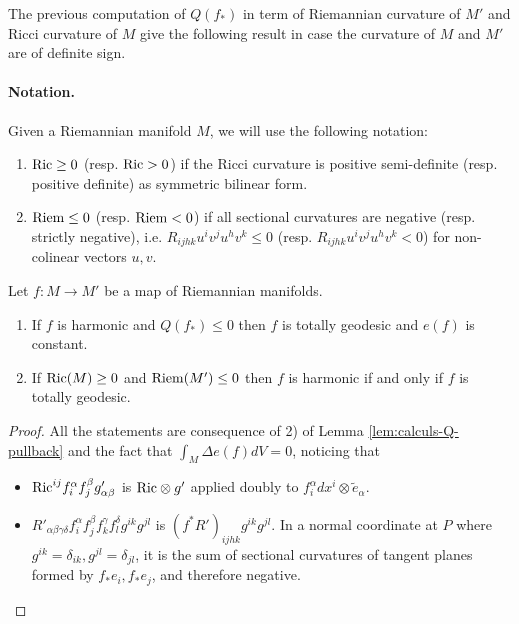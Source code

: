 The previous computation of \(Q(f_*)\) in term of Riemannian curvature of \(M'\) and
Ricci curvature of \(M\) give the following result in case the curvature of \(M\) and \(M'\) are of definite sign.

\paragraph{Notation.}
\label{sec:orgb2c15ad}
Given a Riemannian manifold \(M\), we will use the following notation:
\begin{enumerate}
\item \({\rm Ric} \geq 0\) (resp. \({\rm Ric} > 0\)) if the Ricci curvature is positive
semi-definite (resp. positive definite) as symmetric bilinear form.
\item \({\rm Riem} \leq 0\) (resp. \({\rm Riem} < 0\)) if all sectional curvatures are
negative (resp. strictly negative), i.e. \(R_{ijhk} u^i v^j
   u^h v^k \leq 0\) (resp. \(R_{ijhk} u^i v^j
   u^h v^k < 0\)) for non-colinear vectors \(u,v\).
\end{enumerate}

\begin{corollary}
\label{cor:signed-curvature}
Let \(f: M \longrightarrow M'\) be a map of Riemannian manifolds.
\begin{enumerate}
\item If \(f\) is harmonic and \(Q(f_*) \leq 0\) then \(f\) is totally geodesic and \(e(f)\) is constant.
\item If \({\rm Ric}(M) \geq 0\) and \({\rm Riem}(M')\leq 0\) then \(f\) is harmonic if
and only if \(f\) is totally geodesic.
\end{enumerate}
\end{corollary}

\begin{proof}
All the statements are consequence of 2) of Lemma \ref{lem:calculs-Q-pullback} and the fact
that \(\int_M \Delta e(f)dV = 0\), noticing that
\begin{itemize}
\item \({\rm Ric}^{ij}f^\alpha_i f^\beta_j g'_{\alpha\beta}\) is \({\rm Ric}\otimes g'\)
applied doubly to \(f_i^\alpha dx^i\otimes\tilde e_\alpha\).
\item \(R'_{\alpha\beta\gamma\delta} f^\alpha_i f^\beta_j f^\gamma_k f^\delta_l
   g^{ik}g^{jl}\) is \((f^* R')_{ijhk}g^{ik}g^{jl}\). In a normal coordinate at \(P\)
where \(g^{ik}=\delta_{ik}, g^{jl}=\delta_{jl}\), it is the sum of sectional curvatures of tangent
planes formed by \(f_*e_i, f_*e_j\), and therefore negative.
\end{itemize}
\end{proof}



